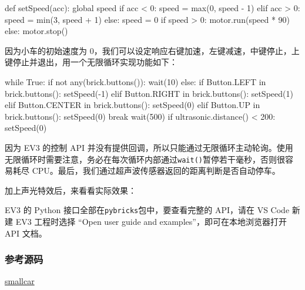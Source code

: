 \begin{pythoncode}
def setSpeed(acc):
    global speed
    if acc < 0:
        speed = max(0, speed - 1)
    elif acc > 0:
        speed = min(3, speed + 1)
    else:
        speed = 0
    if speed > 0:
        motor.run(speed * 90) 
    else:
        motor.stop()
\end{pythoncode}

因为小车的初始速度为
0，我们可以设定响应右键加速，左键减速，中键停止，上键停止并退出，用一个无限循环实现功能如下：

\begin{pythoncode}
while True:
    if not any(brick.buttons()): 
        wait(10)
    else:
        if Button.LEFT in brick.buttons():
            setSpeed(-1)
        elif Button.RIGHT in brick.buttons():
            setSpeed(1)
        elif Button.CENTER in brick.buttons():
            setSpeed(0)
        elif Button.UP in brick.buttons():
            setSpeed(0)
            break
        wait(500)
    if ultrasonic.distance() < 200: 
        setSpeed(0)
\end{pythoncode}

因为 EV3 的控制 API
并没有提供回调，所以只能通过无限循环主动轮询。使用无限循环时需要注意，务必在每次循环内部通过\texttt{wait()}暂停若干毫秒，否则很容易耗尽
CPU。最后，我们通过超声波传感器返回的距离判断是否自动停车。

加上声光特效后，来看看实际效果：

EV3 的 Python 接口全部在\texttt{pybricks}包中，要查看完整的 API，请在 VS
Code 新建 EV3 工程时选择 ``Open user guide and
examples''，即可在本地浏览器打开 API 文档。

\hypertarget{ux53c2ux8003ux6e90ux7801}{%
\subsubsection{参考源码}\label{ux53c2ux8003ux6e90ux7801}}

\href{https://github.com/michaelliao/learn-python3/tree/master/samples/micropython/smallcar}{smallcar}

